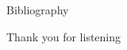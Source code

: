 \documentclass[11pt,aspectratio=169]{beamer}
\begin{document}

	
	


\begin{frame}[allowframebreaks]{Bibliography}
    
    
\end{frame}

\begin{closingframe}
    \smallskip
    {\Large Thank you for listening}
    \medskip
    \vspace{10mm}
\end{closingframe}



	


			
\end{document}

